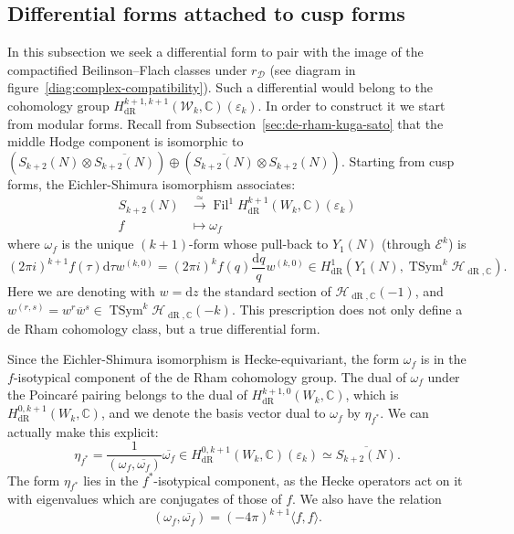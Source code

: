 \documentclass[11pt, a4paper, reqno]{amsart}
\theoremstyle{definition}
\theoremstyle{plain}
\theoremstyle{remark}
\DeclareMathOperator{\TSym}{TSym}
\DeclareMathOperator{\Fil}{Fil}
\DeclareMathOperator{\dR}{dR}
\newcommand{\numberset}{\mathbb}
\newcommand{\C}{\numberset{C}}
\renewcommand{\epsilon}{\varepsilon}
\newcommand{\HS}{\mathscr{H}}
\newcommand{\Ell}{\mathcal{E}}
\newcommand{\KS}{\mathscr{W}}
\newcommand{\del}{\mathcal{D}}
\newcommand{\regulator}[1]{r_{#1}}
\newcommand{\rD}{\regulator{\del}}
\newcommand{\ud}{\mathrm{d}}
\begin{document}
\subsection{Differential forms attached to cusp forms}
\label{subsec:differential-forms}

 In this subsection we seek a differential form to pair with the image of the compactified Beilinson--Flach classes under $\rD$ (see diagram in figure~\ref{diag:complex-compatibility}). Such a differential would belong to the cohomology group $H^{k+1,k+1}_{\dR}(\KS_k, \C)(\epsilon_k)$. In order to construct it we start from modular forms. Recall from Subsection~\ref{sec:de-rham-kuga-sato} that the middle Hodge component is isomorphic to $(S_{k+2}(N)\otimes \overline{S_{k+2}(N)}) \oplus (\overline{S_{k+2}(N)} \otimes S_{k+2}(N))$. Starting from cusp forms, the Eichler-Shimura isomorphism associates:
 \begin{align*}
     S_{k+2}(N) &\xrightarrow{\simeq} \Fil^1 H^{k+1}_{\dR}(W_k,\C)(\epsilon_k) \\
     f &\mapsto \omega_f
 \end{align*}
 where $\omega_f$ is the unique $(k+1)$-form whose pull-back to $Y_1(N)$ (through $\Ell^k$) is
 \[
     (2\pi i)^{k+1} f(\tau)\ud\tau w^{(k,0)} = (2\pi i)^k f(q) \frac{\ud q}{q} w^{(k,0)} \in H^{1}_{\dR}(Y_1(N),\TSym^k \HS_{\dR,\C}).
 \]
 Here we are denoting with $w = \ud z$ the standard section of $\HS_{\dR, \C}(-1)$, and $w^{(r,s)} = w^r \overline{w}^s \in \TSym^k \HS_{\dR, \C}(-k)$. This prescription does not only define a de Rham cohomology class, but a true differential form.

 Since the Eichler-Shimura isomorphism is Hecke-equivariant, the form $\omega_f$ is in the $f$-isotypical component of the de Rham cohomology group. The dual of $\omega_f$ under the Poincaré pairing belongs to the dual of $H^{k+1,0}_{\dR}(W_k,\C)$, which is $H^{0,k+1}_{\dR}(W_k,\C)$, and we denote the basis vector dual to $\omega_f$ by $\eta_{f^*}$. We can actually make this explicit:
 \[
     \eta_{f^*} = \frac{1}{(\omega_f,\overline{\omega_f})} \overline{\omega_f} \in H^{0,k+1}_{\dR}(W_k,\C)(\epsilon_k) \simeq \overline{S_{k+2}(N)}.
 \]
 The form $\eta_{f^*}$ lies in the $f^*$-isotypical component, as the Hecke operators act on it with eigenvalues which are conjugates of those of $f$. We also have the relation 
 \begin{equation}
  \label{eq:petersson}
  (\omega_f,\overline{\omega_f}) = (-4\pi)^{k+1} \langle f,f \rangle.
 \end{equation}
 
\end{document}
